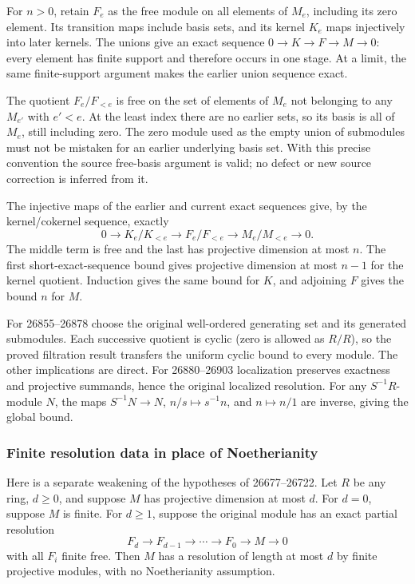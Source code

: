 For \(n>0\), retain \(F_e\) as the free module on all elements of \(M_e\), including its zero element. Its transition maps include basis sets, and its kernel \(K_e\) maps injectively into later kernels. The unions give an exact sequence \(0\to K\to F\to M\to0\): every element has finite support and therefore occurs in one stage. At a limit, the same finite-support argument makes the earlier union sequence exact.

The quotient \(F_e/F_{<e}\) is free on the set of elements of \(M_e\) not belonging to any \(M_{e'}\) with \(e'<e\). At the least index there are no earlier sets, so its basis is all of \(M_e\), still including zero. The zero module used as the empty union of submodules must not be mistaken for an earlier underlying basis set. With this precise convention the source free-basis argument is valid; no defect or new source correction is inferred from it.

The injective maps of the earlier and current exact sequences give, by the kernel/cokernel sequence, exactly \[
0\to K_e/K_{<e}\to F_e/F_{<e}\to M_e/M_{<e}\to0.
\] The middle term is free and the last has projective dimension at most \(n\). The first short-exact-sequence bound gives projective dimension at most \(n-1\) for the kernel quotient. Induction gives the same bound for \(K\), and adjoining \(F\) gives the bound \(n\) for \(M\).

For 26855--26878 choose the original well-ordered generating set and its generated submodules. Each successive quotient is cyclic (zero is allowed as \(R/R\)), so the proved filtration result transfers the uniform cyclic bound to every module. The other implications are direct. For 26880--26903 localization preserves exactness and projective summands, hence the original localized resolution. For any \(S^{-1}R\)-module \(N\), the maps \(S^{-1}N\to N\), \(n/s\mapsto s^{-1}n\), and \(n\mapsto n/1\) are inverse, giving the global bound.

\subsubsection{Finite resolution data in place of Noetherianity}\label{algebra-proof-022-finite-resolution-data-in-place-of-noetherianity}

Here is a separate weakening of the hypotheses of 26677--26722. Let \(R\) be any ring, \(d\ge0\), and suppose \(M\) has projective dimension at most \(d\). For \(d=0\), suppose \(M\) is finite. For \(d\ge1\), suppose the original module has an exact partial resolution \[
F_d\longrightarrow F_{d-1}\longrightarrow\cdots
\longrightarrow F_0\longrightarrow M\longrightarrow0
\] with all \(F_i\) finite free. Then \(M\) has a resolution of length at most \(d\) by finite projective modules, with no Noetherianity assumption.

